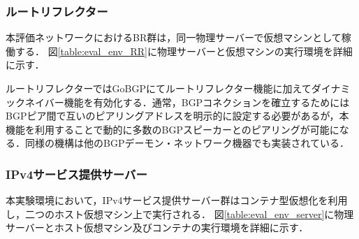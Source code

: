 \subsubsection{ルートリフレクター}
本評価ネットワークにおけるBR群は，同一物理サーバーで仮想マシンとして稼働する．
図\ref{table:eval_env_RR}に物理サーバーと仮想マシンの実行環境を詳細に示す．

ルートリフレクターではGoBGPにてルートリフレクター機能に加えてダイナミックネイバー機能を有効化する．通常，BGPコネクションを確立するためにはBGPピア間で互いのピアリングアドレスを明示的に設定する必要があるが，本機能を利用することで動的に多数のBGPスピーカーとのピアリングが可能になる\cite{GoBGP_dynamic}．同様の機構は他のBGPデーモン・ネットワーク機器でも実装されている\cite{Cisco_dynamic}．


\begin{table}[]
    \label{table:eval_env_RR}
    \caption{評価実験用RR群の実行環境}
\end{table}

\subsubsection{IPv4サービス提供サーバー}
本実験環境において，IPv4サービス提供サーバー群はコンテナ型仮想化\cite{soltesz2007container}を利用し，二つのホスト仮想マシン上で実行される．
図\ref{table:eval_env_server}に物理サーバーとホスト仮想マシン及びコンテナの実行環境を詳細に示す．


